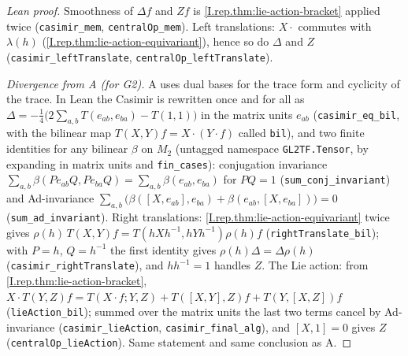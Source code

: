 \begin{proof}[Lean proof]
Smoothness of $\Delta f$ and $Zf$ is \cref{I.rep.thm:lie-action-bracket} applied twice (\texttt{casimir\_mem}, \texttt{centralOp\_mem}). Left translations: $X\cdot$ commutes with $\lambda(h)$ (\cref{I.rep.thm:lie-action-equivariant}), hence so do $\Delta$ and $Z$ (\texttt{casimir\_leftTranslate}, \texttt{centralOp\_leftTranslate}).

\emph{Divergence from A (for G2).} A uses dual bases for the trace form and cyclicity of the trace. In Lean the Casimir is rewritten once and for all as $\Delta=-\tfrac14\bigl(2\sum_{a,b}T(e_{ab},e_{ba})-T(1,1)\bigr)$ in the matrix units $e_{ab}$ (\texttt{casimir\_eq\_bil}, with the bilinear map $T(X,Y)f=X\cdot(Y\cdot f)$ called \texttt{bil}), and two finite identities for any bilinear $\beta$ on $M_2$ (untagged namespace \texttt{GL2TF.Tensor}, by expanding in matrix units and \texttt{fin\_cases}): conjugation invariance $\sum_{a,b}\beta(Pe_{ab}Q,Pe_{ba}Q)=\sum_{a,b}\beta(e_{ab},e_{ba})$ for $PQ=1$ (\texttt{sum\_conj\_invariant}) and Ad-invariance $\sum_{a,b}\bigl(\beta([X,e_{ab}],e_{ba})+\beta(e_{ab},[X,e_{ba}])\bigr)=0$ (\texttt{sum\_ad\_invariant}). Right translations: \cref{I.rep.thm:lie-action-equivariant} twice gives $\rho(h)\,T(X,Y)f=T(hXh^{-1},hYh^{-1})\rho(h)f$ (\texttt{rightTranslate\_bil}); with $P=h$, $Q=h^{-1}$ the first identity gives $\rho(h)\Delta=\Delta\rho(h)$ (\texttt{casimir\_rightTranslate}), and $hh^{-1}=1$ handles $Z$. The Lie action: from \cref{I.rep.thm:lie-action-bracket}, $X\cdot T(Y,Z)f=T(X\cdot f;Y,Z)+T([X,Y],Z)f+T(Y,[X,Z])f$ (\texttt{lieAction\_bil}); summed over the matrix units the last two terms cancel by Ad-invariance (\texttt{casimir\_lieAction}, \texttt{casimir\_final\_alg}), and $[X,1]=0$ gives $Z$ (\texttt{centralOp\_lieAction}). Same statement and same conclusion as A.
\end{proof}


